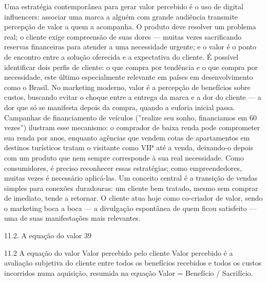 Uma estratégia contemporânea para gerar valor percebido é o uso de digital influencers: associar uma marca a alguém com grande audiência transmite percepção de valor a quem a acompanha. O produto deve resolver um problema real; o cliente exige compreensão de suas dores — muitas vezes sacrificando reservas financeiras para atender a uma necessidade urgente; e o valor é o ponto de encontro entre a solução oferecida e a expectativa do cliente. É possível identificar dois perfis de cliente: o que compra por tendência e o que compra por necessidade, este último especialmente relevante em países em desenvolvimento como o Brasil. No marketing moderno, valor é a percepção de benefícios sobre custos, buscando evitar o choque entre a entrega da marca e a dor do cliente — a dor que só se manifesta depois da compra, quando a euforia inicial passa. Campanhas de financiamento de veículos (”realize seu sonho, financiamos em 60 vezes”) ilustram esse mecanismo: o comprador de baixa renda pode comprometer sua renda por anos, enquanto agências que vendem cotas de apartamentos em destinos turísticos tratam o visitante como VIP até a venda, deixando-o depois com um produto que nem sempre corresponde à sua real necessidade. Como consumidores, é preciso reconhecer essas estratégias; como empreendedores, muitas vezes é necessário aplicá-las. Um conceito central é a transição de vendas simples para conexões duradouras: um cliente bem tratado, mesmo sem comprar de imediato, tende a retornar. O cliente atua hoje como co-criador de valor, sendo o marketing boca a boca — a divulgação espontânea de quem ficou satisfeito — uma de suas manifestações mais relevantes.

11.2. A equação do valor 39

11.2 A equação do valor Valor percebido pelo cliente Valor percebido é a avaliação subjetiva do cliente entre todos os benefícios recebidos e todos os custos incorridos numa aquisição, resumida na equação Valor = Benefício / Sacrifício.

